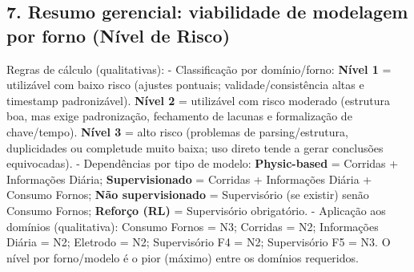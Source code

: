 \clearpage

\clearpage

\subsection{\texorpdfstring{\textbf{7. Resumo gerencial: viabilidade de
modelagem por forno (Nível de
Risco)}}{7. Resumo gerencial: viabilidade de modelagem por forno (Nível de Risco)}}\label{resumo-gerencial-viabilidade-de-modelagem-por-forno-nuxedvel-de-risco}

Regras de cálculo (qualitativas): - Classificação por domínio/forno:
\textbf{Nível 1} = utilizável com baixo risco (ajustes pontuais;
validade/consistência altas e timestamp padronizável). \textbf{Nível 2}
= utilizável com risco moderado (estrutura boa, mas exige padronização,
fechamento de lacunas e formalização de chave/tempo). \textbf{Nível 3} =
alto risco (problemas de parsing/estrutura, duplicidades ou completude
muito baixa; uso direto tende a gerar conclusões equivocadas). -
Dependências por tipo de modelo: \textbf{Physic-based} = Corridas +
Informações Diária; \textbf{Supervisionado} = Corridas + Informações
Diária + Consumo Fornos; \textbf{Não supervisionado} = Supervisório (se
existir) senão Consumo Fornos; \textbf{Reforço (RL)} = Supervisório
obrigatório. - Aplicação aos domínios (qualitativa): Consumo Fornos =
N3; Corridas = N2; Informações Diária = N2; Eletrodo = N2; Supervisório
F4 = N2; Supervisório F5 = N3. O nível por forno/modelo é o pior
(máximo) entre os domínios requeridos.

